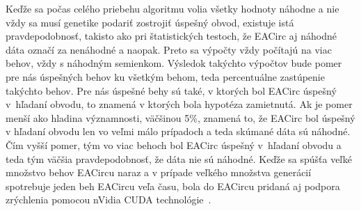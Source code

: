 Keďže sa počas celého priebehu algoritmu volia všetky hodnoty náhodne a nie vždy sa musí genetike podariť zostrojiť úspešný obvod, existuje istá pravdepodobnosť, takisto ako pri štatistických testoch, že EACirc aj náhodné dáta označí za nenáhodné a naopak. Preto sa výpočty vždy počítajú na viac behov, vždy s náhodným semienkom. Výsledok takýchto výpočtov bude pomer pre nás úspešných behov ku všetkým behom, teda percentuálne zastúpenie takýchto behov. Pre nás úspešné behy sú také, v ktorých bol EACirc úspešný v~hľadaní obvodu, to znamená v ktorých bola hypotéza zamietnutá. Ak je pomer menší ako hladina významnosti, väčšinou 5\%, znamená to, že EACirc bol úspešný v hľadaní obvodu len vo veľmi málo prípadoch a teda skúmané dáta sú náhodné. Čím vyšší pomer, tým vo viac behoch bol EACirc úspešný v~hľadaní obvodu a teda tým väčšia pravdepodobnosť, že dáta nie sú náhodné. Keďže sa spúšťa veľké množstvo behov EACircu naraz a v prípade veľkého množstva generácií spotrebuje jeden beh EACircu veľa času, bola do EACircu pridaná aj podpora zrýchlenia pomocou {nVidia CUDA technológie}~\parencite{novotny-bc}.



